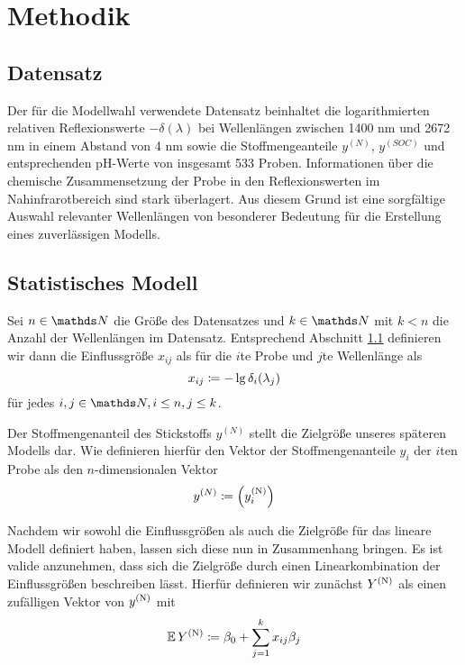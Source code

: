 \section{Methodik}
\label{sec:Methodik}

	\subsection{Datensatz}
	\label{ssec:Datensatz}

	    Der für die Modellwahl verwendete Datensatz beinhaltet die logarithmierten relativen Reflexionswerte $-\delta(\lambda)$ bei Wellenlängen zwischen 1400 nm und 2672 nm in einem Abstand von 4 nm sowie die Stoffmengeanteile $y^{(N)}$, $y^{(SOC)}$ und entsprechenden pH-Werte von insgesamt 533 Proben.
	    Informationen über die chemische Zusammensetzung der Probe in den Reflexionswerten im Nahinfrarotbereich sind stark überlagert. \cite{Agelet2010}
	    Aus diesem Grund ist eine sorgfältige Auswahl relevanter Wellenlängen von besonderer Bedeutung für die Erstellung eines zuverlässigen Modells.



	\subsection{Statistisches Modell}
	\label{ssec:Statistisches Modell}

	    Sei $n\in\SN$ die Größe des Datensatzes und $k\in\SN$ mit $k< n$ die Anzahl der Wellenlängen im Datensatz.
	    Entsprechend Abschnitt \ref{ssec:Datensatz} definieren wir dann die Einflussgröße $x_{ij}$ als für die $i$te Probe und $j$te Wellenlänge als
	    \[
			x_{ij} \coloneqq -\lg \delta_i(\lambda_j)
		\]
		für jedes $i,j\in\SN,i\leq n,j\leq k$.

	    Der Stoffmengenanteil des Stickstoffs  $y^{(N)}$ stellt die Zielgröße unseres späteren Modells dar.
	    Wie definieren hierfür den Vektor der Stoffmengenanteile $y_i$ der $i$ten Probe als den $n$-dimensionalen Vektor
		\[
			 y^{(N)} \coloneqq \left( y^{\mathrm{(N)}}_i \right)
		\]

        Nachdem wir sowohl die Einflussgrößen als auch die Zielgröße für das lineare Modell definiert haben, lassen sich diese nun in Zusammenhang bringen.
        Es ist valide anzunehmen, dass sich die Zielgröße durch einen Linearkombination der Einflussgrößen beschreiben lässt.
        Hierfür definieren wir zunächst $Y^{\mathrm{(N)}}$ als einen zufälligen Vektor von $y^{\mathrm{(N)}}$ mit
        \[
			 \operatorname{\mathbb{E}} Y^{\mathrm{(N)}} \coloneqq \beta_0 + \sum_{j=1}^k{x_{ij}\beta_j}
		\]

